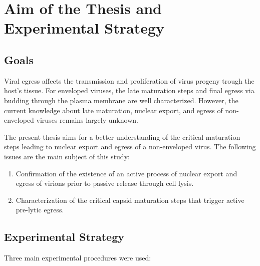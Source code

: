 
\chapter{Aim of the Thesis and Experimental Strategy} %

\label{Aim} 


\graphicspath{{./Pictures/}}


\section{Goals}

Viral egress affects the transmission and proliferation of virus progeny trough the host's tissue. For enveloped viruses, the late maturation steps and final egress via budding through the plasma membrane are well characterized. However, the current knowledge about late maturation, nuclear export, and egress of non-enveloped viruses remains largely unknown. 

The present thesis aims for a better understanding of the critical maturation steps leading to nuclear export and egress of a non-enveloped virus. The following issues are the main subject of this study: 




\medskip

\begin{enumerate}
\item Confirmation of the existence of an active process of nuclear export and egress of virions prior to passive release through cell lysis. 
\item Characterization of the critical capsid maturation steps that trigger active pre-lytic egress.
\end{enumerate}

\bigskip
\bigskip

\section{Experimental Strategy}

Three main experimental procedures were used:

\medskip


